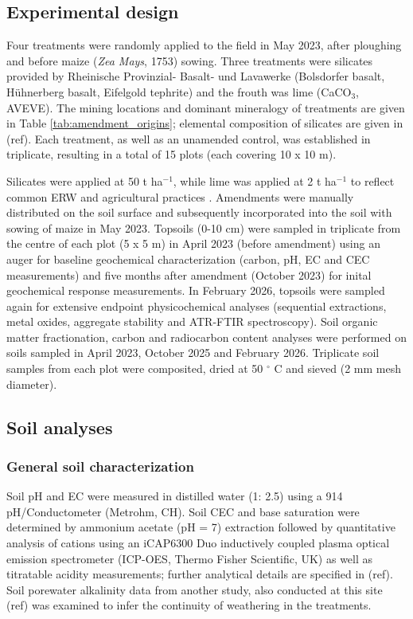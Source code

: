 \documentclass[preprint,12pt]{elsarticle}
\begin{document}
\subsection{Experimental design}
\label{subsec:experimental_design}

Four treatments were randomly applied to the field in May 2023, after ploughing and before maize (\textit{Zea Mays}, 1753) sowing. Three treatments were silicates provided by Rheinische Provinzial- Basalt- und Lavawerke (Bolsdorfer basalt, H\"uhnerberg basalt, Eifelgold tephrite) and the frouth was lime (CaCO$_3$, AVEVE). The mining locations and dominant mineralogy of treatments are given in Table \ref{tab:amendment_origins}; elemental composition of silicates are given in (ref). Each treatment, as well as an unamended control, was established in triplicate, resulting in a total of 15 plots (each covering 10 x 10 m). 
  
Silicates were applied at 50 t ha$^{-1}$, while lime was applied at 2 t ha$^{-1}$ to reflect common ERW and agricultural practices \citep{steinwidder2025beyond}. Amendments were manually distributed on the soil surface and subsequently incorporated into the soil with sowing of maize in May 2023. Topsoils (0-10 cm) were sampled in triplicate from the centre of each plot (5 x 5 m) in April 2023 (before amendment) using an auger for baseline geochemical characterization (carbon, pH, EC and CEC measurements) and five months after amendment (October 2023) for inital geochemical response measurements. In February 2026, topsoils were sampled again for extensive endpoint physicochemical analyses (sequential extractions, metal oxides, aggregate stability and ATR-FTIR spectroscopy). Soil organic matter fractionation, carbon and radiocarbon content analyses were performed on soils sampled in April 2023, October 2025 and February 2026. Triplicate soil samples from each plot were composited, dried at 50 $^\circ$ C and sieved (2 mm mesh diameter).
  
\subsection{Soil analyses}
\label{subsec:soil_analyses}

\subsubsection{General soil characterization}
  
Soil pH and EC were measured in distilled water (1: 2.5) using a 914 pH/Conductometer (Metrohm, CH). Soil CEC and base saturation were determined by ammonium acetate (pH = 7) extraction followed by quantitative analysis of cations using an iCAP6300 Duo inductively coupled plasma optical emission spectrometer (ICP-OES, Thermo Fisher Scientific, UK) as well as titratable acidity measurements; further analytical details are specified in (ref). Soil porewater alkalinity data from another study, also conducted at this site (ref) was examined to infer the continuity of weathering in the treatments. 
\end{document}
